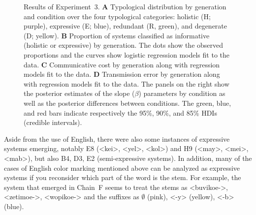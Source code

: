 \documentclass[doc,biblatex]{apa7}
\begin{document}
	\begin{figure}
	\vspace*{2pt}
	\caption{Results of Experiment~3. \textbf{A} Typological distribution by generation and condition over the four typological categories: holistic (H; purple), expressive (E; blue), redundant (R, green), and degenerate (D; yellow). \textbf{B} Proportion of systems classified as informative (holistic or expressive) by generation. The dots show the observed proportions and the curves show logistic regression models fit to the data. \textbf{C} Communicative cost by generation along with regression models fit to the data. \textbf{D} Transmission error by generation along with regression models fit to the data. The panels on the right show the posterior estimates of the slope ($\beta$) parameters by condition as well as the posterior differences between conditions. The green, blue, and red bars indicate respectively the 95\%, 90\%, and 85\% HDIs (credible intervals).}
	\label{supp3}
	\end{figure}

Aside from the use of English, there were also some instances of expressive systems emerging, notably E8 (<kei>, <yel>, <kol>) and H9 (<may>, <mei>, <mab>), but also B4, D3, E2 (semi-expressive systems). In addition, many of the cases of English color marking mentioned above can be analyzed as expressive systems if you reconsider which part of the word is the stem. For example, the system that emerged in Chain~F seems to treat the stems as <buvikoe->, <zetimoe->, <wopikoe-> and the suffixes as $\emptyset$ (pink), <-y> (yellow), <-b> (blue).
\end{document}
